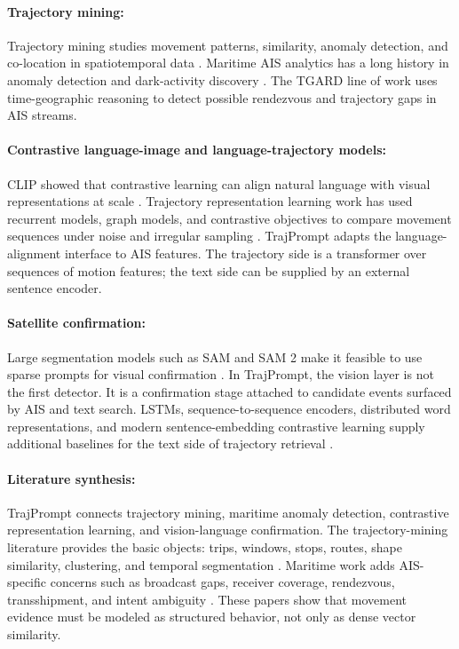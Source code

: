 \documentclass{article}
\begin{document}
\paragraph{Trajectory mining:}
Trajectory mining studies movement patterns, similarity, anomaly detection, and co-location in spatiotemporal data \citep{zheng2015trajectory}. Maritime AIS analytics has a long history in anomaly detection and dark-activity discovery \citep{pallotta2013vessel,nguyen2020geotracknet}. The TGARD line of work uses time-geographic reasoning to detect possible rendezvous and trajectory gaps in AIS streams.

\paragraph{Contrastive language-image and language-trajectory models:}
CLIP showed that contrastive learning can align natural language with visual representations at scale \citep{radford2021learning}. Trajectory representation learning work has used recurrent models, graph models, and contrastive objectives to compare movement sequences under noise and irregular sampling \citep{yao2022cstrm,li2023clais}. TrajPrompt adapts the language-alignment interface to AIS features. The trajectory side is a transformer over sequences of motion features; the text side can be supplied by an external sentence encoder.

\paragraph{Satellite confirmation:}
Large segmentation models such as SAM and SAM 2 make it feasible to use sparse prompts for visual confirmation \citep{kirillov2023segment,ravi2024sam2}. In TrajPrompt, the vision layer is not the first detector. It is a confirmation stage attached to candidate events surfaced by AIS and text search. LSTMs, sequence-to-sequence encoders, distributed word representations, and modern sentence-embedding contrastive learning supply additional baselines for the text side of trajectory retrieval \citep{hochreiter1997lstm,mikolov2013distributed,cho2014rnnencoder,gao2021simcse}.



\paragraph{Literature synthesis:}
TrajPrompt connects trajectory mining, maritime anomaly detection, contrastive representation learning, and vision-language confirmation. The trajectory-mining literature provides the basic objects: trips, windows, stops, routes, shape similarity, clustering, and temporal segmentation \citep{zheng2015trajectory,lee2007traclus,li2018t2vec,sakoe1978dtw,yuan2010tdrive,zheng2010geolife}. Maritime work adds AIS-specific concerns such as broadcast gaps, receiver coverage, rendezvous, transshipment, and intent ambiguity \citep{pallotta2013vessel,nguyen2020geotracknet,sharma2022tist,ristic2008maritime}. These papers show that movement evidence must be modeled as structured behavior, not only as dense vector similarity.
\end{document}
